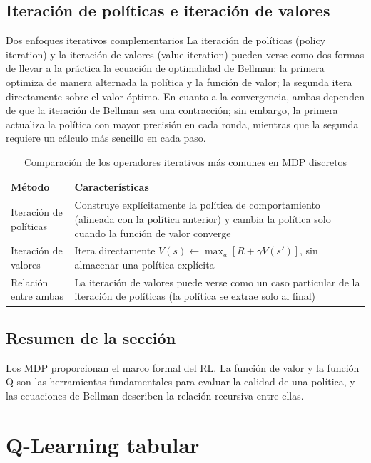 \documentclass[a4paper]{article}
\begin{document}
\subsection{Iteración de políticas e iteración de valores}

\begin{knowledgebox}{Dos enfoques iterativos complementarios}
La iteración de políticas (policy iteration) y la iteración de valores (value iteration) pueden verse como dos formas de llevar a la práctica la ecuación de optimalidad de Bellman: la primera optimiza de manera alternada la política y la función de valor; la segunda itera directamente sobre el valor óptimo. En cuanto a la convergencia, ambas dependen de que la iteración de Bellman sea una contracción; sin embargo, la primera actualiza la política con mayor precisión en cada ronda, mientras que la segunda requiere un cálculo más sencillo en cada paso.
\end{knowledgebox}

\begin{table}[H]
\centering
\begin{tabular}{ll}
\toprule
Método & Características \\
\midrule
Iteración de políticas & Construye explícitamente la política de comportamiento (alineada con la política anterior) y cambia la política solo cuando la función de valor converge \\
Iteración de valores & Itera directamente $V(s) \leftarrow \max_a [R+\gamma V(s')]$, sin almacenar una política explícita \\
Relación entre ambas & La iteración de valores puede verse como un caso particular de la iteración de políticas (la política se extrae solo al final) \\
\bottomrule
\end{tabular}
\caption{Comparación de los operadores iterativos más comunes en MDP discretos}
\label{tab:mdp-iteration}
\end{table}

\subsection{Resumen de la sección}

Los MDP proporcionan el marco formal del RL. La función de valor y la función Q son las herramientas fundamentales para evaluar la calidad de una política, y las ecuaciones de Bellman describen la relación recursiva entre ellas.
\section{Q-Learning tabular}
\end{document}
